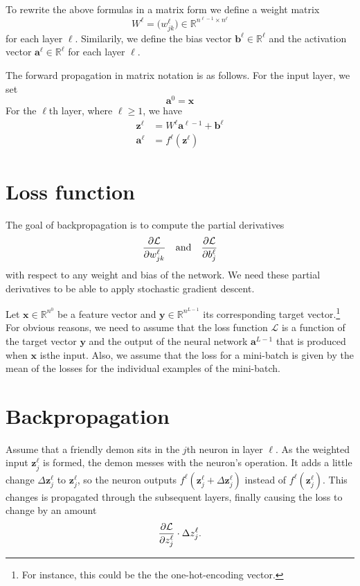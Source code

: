\documentclass[12pt]{article}
\newcommand{\R}{\mathbb{R}}
\newcommand{\x}{\boldsymbol{x}}
\renewcommand{\a}{\boldsymbol{a}}
\renewcommand{\b}{\boldsymbol{b}}
\newcommand{\z}{\boldsymbol{z}}
\newcommand{\y}{\boldsymbol{y}}
\newcommand{\cL}{\mathcal{L}}
\begin{document}
To rewrite the above formulas in a matrix form we define a weight matrix
\begin{equation}
W^\ell = \Big( w^\ell_{jk} \Big) \in \R^{n^{\ell-1} \times n^\ell}
\end{equation}
for each layer $\ell$. Similarily, we define the bias vector $\b^\ell\in\R^\ell$ and the activation vector $\a^\ell\in\R^\ell$ for each layer $\ell$.

The forward propagation in  matrix notation is as follows. For the input layer, we set
\begin{equation}
\a^{0} = \x 
\end{equation}
For the $\ell$th layer, where $\ell\ge 1$, we have
\begin{align}
\z^\ell &= W^\ell \a^{\ell-1} + \b^\ell \\
\a^\ell &= f^\ell (\z^\ell)
\end{align}

\section{Loss function}
The goal of backpropagation is to compute the partial derivatives
\begin{equation}
{\partial \cL \over \partial w^\ell_{jk}}  \quad\mbox{and} \quad {\partial \cL \over \partial b^\ell_j}
\end{equation}
with respect to any weight and bias of the network. We need these partial derivatives to be able to apply stochastic gradient descent.

Let $\x\in\R^{n^{0}}$ be a feature vector and $\y\in\R^{n^{L-1}}$ its corresponding target vector.\footnote{For instance, this could be the the one-hot-encoding vector.} 
For obvious reasons, we need to assume that the loss function $\cL$ is a function of the target vector $\y$ and the output of the neural network $\a^{L-1}$ that is produced when $\x$ isthe input. Also, we assume that the loss for a mini-batch is given by the mean of the losses for the individual examples of the mini-batch.

\section{Backpropagation}

Assume that a friendly demon sits in the $j$th neuron in layer $\ell$. As the weighted input $\z^\ell_j$ is formed, the demon messes with the neuron's operation. It adds a little change $\Delta \z^\ell_j$ to $\z^\ell_j$, so the neuron outputs $f^\ell(\z^\ell_j + \Delta \z^\ell_j)$ instead of $f^\ell(\z^{\ell}_j)$. This changes is propagated through the subsequent layers, finally causing the loss to change by an amount
\begin{equation}
{\partial \cL \over \partial z^\ell_j} \cdot \Delta z^\ell_j.
\end{equation}
\end{document}
